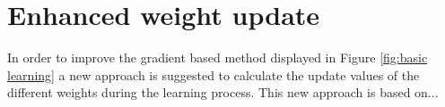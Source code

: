 \chapter{Enhanced weight update\\}
\label{cha:Enhanced learning approach}
In order to improve the gradient based method displayed in Figure \ref{fig:basic learning} a new approach is suggested to calculate the update values of the different weights during the learning process. This new approach is based on...

